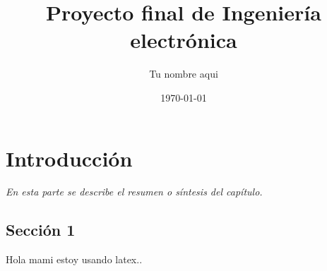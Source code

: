 \documentclass[]{book}
\title{\bf Proyecto final de Ingeniería electrónica}
\author{Tu nombre aqui}
\date{\today}
\begin{document}
\frontmatter
\maketitle
\tableofcontents

\mainmatter
\chapter{Introducción}
\begin{center}
\textit{En esta parte se describe el resumen o síntesis
del capítulo.}
\end{center}

\section{Sección 1}
Hola mami estoy usando latex..
\end{document}
